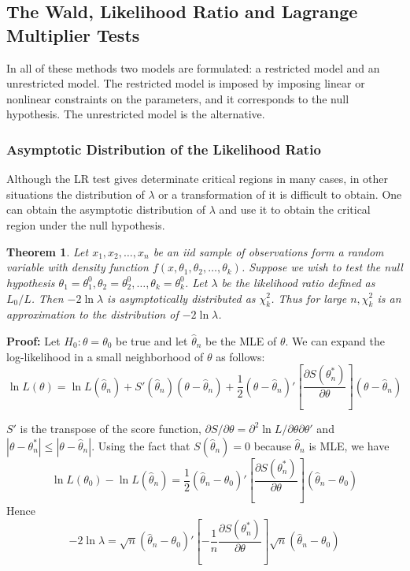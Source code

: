 \documentclass{article}
\newtheorem{theorem}{Theorem}[section]
\begin{document}
\subsection{The Wald, Likelihood Ratio and Lagrange Multiplier Tests}

In all of these methods two models are formulated: a restricted model and an unrestricted model. The restricted model is imposed by imposing linear or nonlinear constraints on the parameters, and it corresponds to the null hypothesis. The unrestricted model is the alternative.

\subsubsection{Asymptotic Distribution of the Likelihood Ratio}

Although the LR test gives determinate critical regions in many cases, in other situations the distribution of \(\lambda\) or a transformation of it is difficult to obtain. One can obtain the asymptotic distribution of $\lambda$ and use it to obtain the critical region under the null hypothesis.

\begin{theorem}
    Let \(x_1,x_2,\dots,x_n\) be an iid sample of observations form a random variable with density function \(f(x,\theta_1,\theta_2,\dots,\theta_k)\). Suppose we wish to test the null hypothesis \(\theta_1=\theta_1^0,\theta_2=\theta_2^0,\dots,\theta_k=\theta_k^0\). Let $\lambda$ be the likelihood ratio defined as \(L_0/\hat{L}\). Then \(-2\ln{\lambda}\) is asymptotically distributed as \(\chi_k^2\). Thus for large $n, \chi_k^2$ is an approximation to the distribution of \(-2 \ln{\lambda}\).
\end{theorem}

\textbf{Proof:} Let \(H_0:\theta=\theta_0\) be true and let \(\hat{\theta}_n\) be the MLE of \(\theta\). We can expand the log-likelihood in a small neighborhood of \(\theta\) as follows:
\begin{equation*}
    \ln{L(\theta)}=\ln{L(\hat{\theta}_n)}+S'(\hat{\theta}_n)(\theta-\hat{\theta}_n)+\frac{1}{2}(\theta-\hat{\theta}_n)'\left[\frac{\partial S(\theta_n^*)}{\partial \theta}\right] (\theta-\hat{\theta}_n)
\end{equation*}

\(S'\) is the transpose of the score function, \(\partial S/\partial \theta=\partial^2 \ln{L}/\partial \theta \partial \theta'\) and \(|\theta-\theta_n^*| \leq |\theta-\hat{\theta}_n|\). Using the fact that \(S(\hat{\theta}_n)=0\) because \(\hat{\theta}_n\) is MLE, we have
\begin{equation*}
    \ln{L(\theta_0)}-\ln{L(\hat{\theta}_n)}=\frac{1}{2} (\hat{\theta}_n-\theta_0)'\left[\frac{\partial S(\theta_n^*)}{\partial \theta}\right] (\hat{\theta}_n-\theta_0)
\end{equation*}
Hence
\begin{equation*}
    -2 \ln{\lambda} = \sqrt{n} (\hat{\theta}_n-\theta_0)' \left[-\frac{1}{n} \frac{\partial S(\theta_n^*)}{\partial \theta}\right] \sqrt{n} (\hat{\theta}_n-\theta_0)
\end{equation*}
\end{document}
